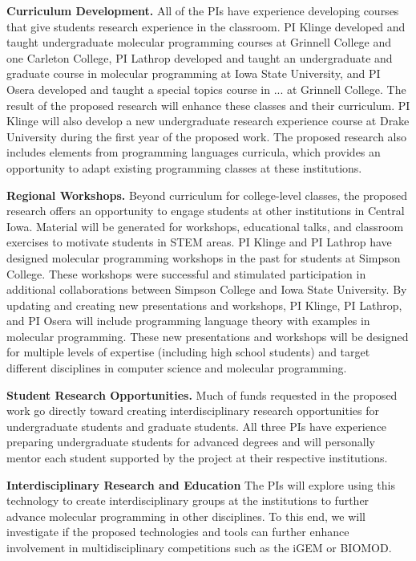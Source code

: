 \textbf{Curriculum Development.}
All of the PIs have experience developing courses that give students research experience in the classroom.
PI Klinge developed and taught undergraduate molecular programming courses at Grinnell College and one Carleton College, PI Lathrop developed and taught an undergraduate and graduate course in molecular programming at Iowa State University, and PI Osera developed and taught a special topics course in ... at Grinnell College.
The result of the proposed research will enhance these classes and their curriculum.
PI Klinge will also develop a new undergraduate research experience course at Drake University during the first year of the proposed work.
The proposed research also includes elements from programming languages curricula, which provides an opportunity to adapt existing programming classes at these institutions.

\textbf{Regional Workshops.}
Beyond curriculum for college-level classes, the proposed research offers an opportunity to engage students at other institutions in Central Iowa.
Material will be generated for workshops, educational talks, and classroom exercises to  motivate students in STEM areas.
PI Klinge and PI Lathrop have designed molecular programming workshops in the past for students at Simpson College.
These workshops were successful and stimulated participation in additional collaborations between Simpson College and Iowa State University.
By updating and creating new presentations and workshops, PI Klinge, PI Lathrop, and PI Osera will include programming language theory with examples in molecular programming.
These new presentations and workshops will be designed for multiple levels of expertise (including high school students) and target different disciplines in computer science and molecular programming.

\textbf{Student Research Opportunities.}
Much of funds requested in the proposed work go directly toward creating interdisciplinary research opportunities for undergraduate students and graduate students.
All three PIs have experience preparing undergraduate students for advanced degrees and will personally mentor each student supported by the project at their respective institutions.

\textbf{Interdisciplinary Research and Education}
The PIs will explore using this technology to create interdisciplinary groups at the institutions to further advance molecular programming in other disciplines.
To this end, we will investigate if the proposed technologies and tools can further enhance involvement in multidisciplinary competitions such as the iGEM or BIOMOD.
